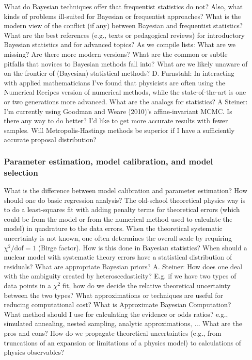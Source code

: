   \bi
    \I What do Bayesian techniques offer that frequentist
      statistics do not?
    \bi
      \I Also, what kinds of problems ill-suited for
	Bayesian or frequentist approaches?
    \ei
    \I What is the modern view of the conflict (if any)
      between Bayesian and frequentist statistics?
    \I What are the best references (e.g., texts or
      pedagogical reviews) for introductory Bayesian
      statistics and for advanced topics?
    \bi
      \I As we compile lists: What are we missing? Are there
	more modern versions?
    \ei
    \I What are the common or subtle pitfalls that novices to
      Bayesian methods fall into?
    \I What are we likely unaware of on the frontier of
      (Bayesian) statistical methods?
    \bi
      \I D. Furnstahl: In
	interacting with applied mathematicians I've found that
	physicists are often using the Numerical Recipes version
	of numerical methods, while the state-of-the-art is one
	or two generations more advanced. What are the analogs
	for statistics?
      \I A Steiner: I'm currently using Goodman and Weare
	(2010)'s affine-invariant MCMC. Is there any way
	to do better? I'd like to get more accurate results
	with fewer samples. Will Metropolis-Hastings methods
	be superior if I have a sufficiently accurate
	proposal distribution?
    \ei
  \ei
  
  \subsubsection{Parameter estimation, model calibration, and
      model selection}

  \bi
    \I What is the difference between model calibration and
      parameter estimation?
    \I How should one do basic regression analysis?
    \bi
      \I The old-school theoretical physics way is to do a
	least-squares fit with adding penalty terms for
	theoretical errors (which could be from the model or
	from the numerical method used to calculate the model)
	in quadrature to the data errors.
      \I When the theoretical systematic uncertainty is not
	known, one often determines the overall scale by
	requiring \( \chi^2/\mathrm{dof} = 1 \)
	(Birge factor). How is this done in
	Bayesian statistics?
      \I When should a nuclear model with systematic theory
	errors have a statistical distribution of residuals?
      \I What are appropriate Bayesian priors?
      \I A. Steiner: How does one deal with the
	ambiguity created by heteroscedasticity? E.g.
	if we have two types of data points in a
	\( \chi^2 \) fit, how do we decide the
	relative theoretical uncertainty between
	the two types?
    \ei
    \I What approximations or techniques are useful for
      reducing computational cost?
    \I What is Approximate Bayesian Computation?
    \I What method should I use for calculating the evidence
      or odds ratios?
    \bi
      \I e.g., simulated annealing, nested sampling, analytic
	approximations, ...
      \I What are the pros and cons?
    \ei
    \I How do we propagate theoretical uncertainties (e.g.,
      from truncations of an expansion or limitations of a physics
      model) to calculations of physics observables?
  \ei
  
